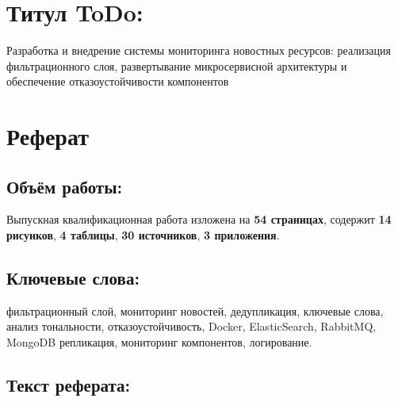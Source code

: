 \hypertarget{ux442ux438ux442ux443ux43b-todo}{%
\section{\texorpdfstring{\textbf{Титул
ToDo:}}{Титул ToDo:}}\label{ux442ux438ux442ux443ux43b-todo}}

Разработка и внедрение системы мониторинга новостных ресурсов:
реализация фильтрационного слоя, развертывание микросервисной
архитектуры и обеспечение отказоустойчивости компонентов

\hypertarget{section}{%
\subsection{}\label{section}}

\hypertarget{ux440ux435ux444ux435ux440ux430ux442}{%
\section{Реферат}\label{ux440ux435ux444ux435ux440ux430ux442}}

\hypertarget{ux43eux431ux44aux451ux43c-ux440ux430ux431ux43eux442ux44b}{%
\subsection{Объём
работы:}\label{ux43eux431ux44aux451ux43c-ux440ux430ux431ux43eux442ux44b}}

Выпускная квалификационная работа изложена на \textbf{54 страницах},
содержит \textbf{14 рисунков}, \textbf{4 таблицы}, \textbf{30
источников}, \textbf{3 приложения}.

\hypertarget{ux43aux43bux44eux447ux435ux432ux44bux435-ux441ux43bux43eux432ux430}{%
\subsection{Ключевые
слова:}\label{ux43aux43bux44eux447ux435ux432ux44bux435-ux441ux43bux43eux432ux430}}

фильтрационный слой, мониторинг новостей, дедупликация, ключевые слова,
анализ тональности, отказоустойчивость, Docker, ElasticSearch, RabbitMQ,
MongoDB репликация, мониторинг компонентов, логирование.

\hypertarget{ux442ux435ux43aux441ux442-ux440ux435ux444ux435ux440ux430ux442ux430}{%
\subsection{Текст
реферата:}\label{ux442ux435ux43aux441ux442-ux440ux435ux444ux435ux440ux430ux442ux430}}

